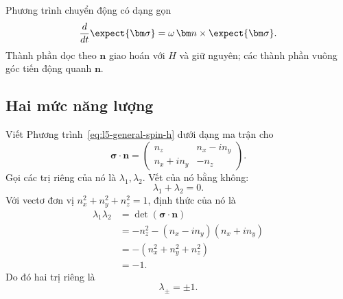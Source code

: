 Phương trình chuyển động có dạng gọn
\begin{equation}
\frac{d}{dt}\expect{\bm\sigma}
=\omega\,\bm n\times\expect{\bm\sigma}.
\end{equation}
Thành phần dọc theo \(\bm n\) giao hoán với \(H\) và giữ nguyên; các thành phần vuông góc tiến động quanh \(\bm n\).

\begin{classroomqa}
\end{classroomqa}

\begin{classroomqa}
\end{classroomqa}

\subsection{Hai mức năng lượng}

Viết Phương trình~\eqref{eq:l5-general-spin-h} dưới dạng ma trận cho
\begin{equation}
\bm\sigma\cdot\bm n
=
\begin{pmatrix}
n_z & n_x-in_y\\
n_x+in_y & -n_z
\end{pmatrix}.
\end{equation}
Gọi các trị riêng của nó là \(\lambda_1,\lambda_2\). Vết của nó bằng không:
\begin{equation}
\lambda_1+\lambda_2=0.
\end{equation}
Với vectơ đơn vị \(n_x^2+n_y^2+n_z^2=1\), định thức của nó là
\begin{align}
\lambda_1\lambda_2
&=\det(\bm\sigma\cdot\bm n)\\
&=-n_z^2-(n_x-in_y)(n_x+in_y)\\
&=-(n_x^2+n_y^2+n_z^2)\\
&=-1.
\end{align}
Do đó hai trị riêng là
\begin{equation}
\lambda_\pm=\pm1.
\end{equation}

